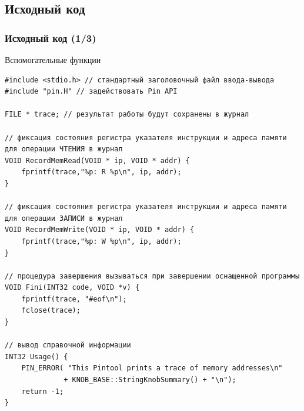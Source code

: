\documentclass{beamer}
\begin{document}
\subsection{Исходный код}

\begin{frame}[fragile] %
\frametitle{Исходный код (1/3)}

\begin{block}{Вспомогательные функции}
\begin{verbatim}
#include <stdio.h> // стандартный заголовочный файл ввода-вывода
#include "pin.H" // задействовать Pin API

FILE * trace; // результат работы будут сохранены в журнал

// фиксация состояния регистра указателя инструкции и адреса памяти для операции ЧТЕНИЯ в журнал
VOID RecordMemRead(VOID * ip, VOID * addr) {
    fprintf(trace,"%p: R %p\n", ip, addr);
}

// фиксация состояния регистра указателя инструкции и адреса памяти для операции ЗАПИСИ в журнал
VOID RecordMemWrite(VOID * ip, VOID * addr) {
    fprintf(trace,"%p: W %p\n", ip, addr);
}

// процедура завершения вызываться при завершении оснащенной программы
VOID Fini(INT32 code, VOID *v) {
    fprintf(trace, "#eof\n");
    fclose(trace);
}

// вывод справочной информации
INT32 Usage() {
    PIN_ERROR( "This Pintool prints a trace of memory addresses\n" 
              + KNOB_BASE::StringKnobSummary() + "\n");
    return -1;
}
\end{verbatim}
\end{block}
\end{frame}

\end{document}
